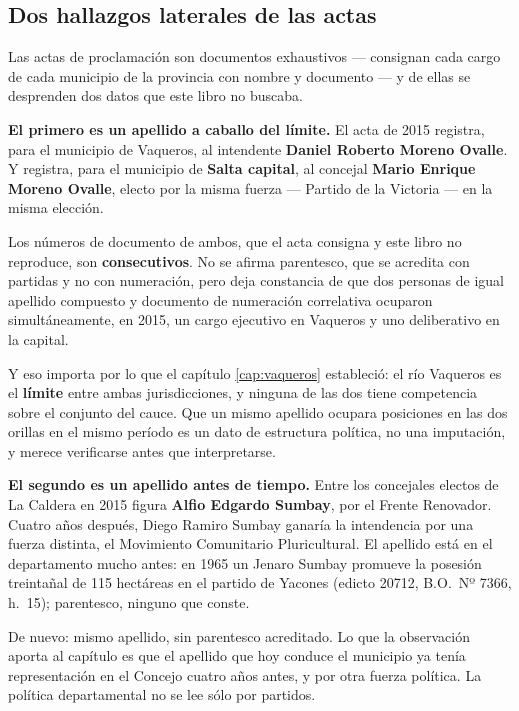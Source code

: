 \subsection*{Dos hallazgos laterales de las actas}

Las actas de proclamación son documentos exhaustivos --- consignan cada cargo de cada municipio de la provincia con nombre y documento --- y de ellas se desprenden dos datos que este libro no buscaba.

\begin{cautela}
\textbf{El primero es un apellido a caballo del límite.} El acta de 2015 registra, para el municipio de Vaqueros, al intendente \textbf{Daniel Roberto Moreno Ovalle}. Y registra, para el municipio de \textbf{Salta capital}, al concejal \textbf{Mario Enrique Moreno Ovalle}, electo por la misma fuerza --- Partido de la Victoria --- en la misma elección.

Los números de documento de ambos, que el acta consigna y este libro no reproduce, son \textbf{consecutivos}. No se afirma parentesco, que se acredita con partidas y no con numeración, pero deja constancia de que dos personas de igual apellido compuesto y documento de numeración correlativa ocuparon simultáneamente, en 2015, un cargo ejecutivo en Vaqueros y uno deliberativo en la capital.

Y eso importa por lo que el capítulo \ref{cap:vaqueros} estableció: el río Vaqueros es el \textbf{límite} entre ambas jurisdicciones, y ninguna de las dos tiene competencia sobre el conjunto del cauce. Que un mismo apellido ocupara posiciones en las dos orillas en el mismo período es un dato de estructura política, no una imputación, y merece verificarse antes que interpretarse.
\end{cautela}

\textbf{El segundo es un apellido antes de tiempo.} Entre los concejales electos de La Caldera en 2015 figura \textbf{Alfio Edgardo Sumbay}, por el Frente Renovador. Cuatro años después, Diego Ramiro Sumbay ganaría la intendencia por una fuerza distinta, el Movimiento Comunitario Pluricultural. El apellido está en el departamento mucho antes: en 1965 un Jenaro Sumbay promueve la posesión treintañal de 115 hectáreas en el partido de Yacones (edicto 20712, B.O.\ Nº 7366, h.\ 15); parentesco, ninguno que conste.

De nuevo: mismo apellido, sin parentesco acreditado. Lo que la observación aporta al capítulo es que el apellido que hoy conduce el municipio ya tenía representación en el Concejo cuatro años antes, y por otra fuerza política. La política departamental no se lee sólo por partidos.

